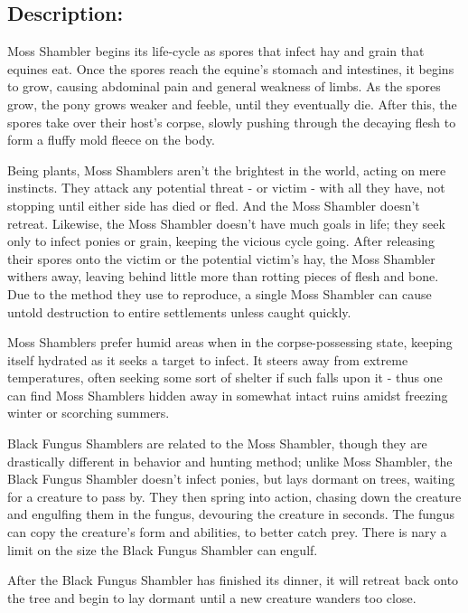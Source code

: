 \documentclass[11pt,a4paper,twocolumn]{book}
\begin{document}
	\subsection*{Description:}
	Moss Shambler begins its life-cycle as spores that infect hay and grain that equines eat. Once the spores reach the equine's stomach and intestines, it begins to grow, causing abdominal pain and general weakness of limbs. As the spores grow, the pony grows weaker and feeble, until they eventually die. After this, the spores take over their host's corpse, slowly pushing through the decaying flesh to form a fluffy mold fleece on the body.
	
	\bigskip
	Being plants, Moss Shamblers aren't the brightest in the world, acting on mere instincts. They attack any potential threat - or victim - with all they have, not stopping until either side has died or fled. And the Moss Shambler doesn't retreat. Likewise, the Moss Shambler doesn't have much goals in life; they seek only to infect ponies or grain, keeping the vicious cycle going. After releasing their spores onto the victim or the potential victim's hay, the Moss Shambler withers away, leaving behind little more than rotting pieces of flesh and bone. Due to the method they use to reproduce, a single Moss Shambler can cause untold destruction to entire settlements unless caught quickly.
	
	Moss Shamblers prefer humid areas when in the corpse-possessing state, keeping itself hydrated as it seeks a target to infect. It steers away from extreme temperatures, often seeking some sort of shelter if such falls upon it - thus one can find Moss Shamblers hidden away in somewhat intact ruins amidst freezing winter or scorching summers.
	
	\bigskip
	Black Fungus Shamblers are related to the Moss Shambler, though they are drastically different in behavior and hunting method; unlike Moss Shambler, the Black Fungus Shambler doesn't infect ponies, but lays dormant on trees, waiting for a creature to pass by. They then spring into action, chasing down the creature and engulfing them in the fungus, devouring the creature in seconds. The fungus can copy the creature's form and abilities, to better catch prey. There is nary a limit on the size the Black Fungus Shambler can engulf.
	
	After the Black Fungus Shambler has finished its dinner, it will retreat back onto the tree and begin to lay dormant until a new creature wanders too close.
	
	\clearpage
	
\end{document}
